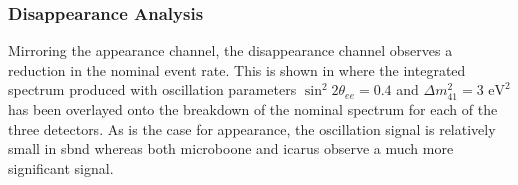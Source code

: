 \subsubsection{\texorpdfstring{\nue Disappearance Analysis}{nue Disappearance Analysis}}

Mirroring the \nue appearance channel, the \nue disappearance channel observes a reduction in the nominal \nue event rate. This is shown in  where the integrated spectrum produced with oscillation parameters $\sin^2{2\theta_{ee}} = 0.4$ and $\Delta m^2_{41} = 3 \text{ eV}^2$ has been overlayed onto the breakdown of the nominal spectrum for each of the three detectors. As is the case for \nue appearance, the oscillation signal is relatively small in \gls{sbnd} whereas both \gls{microboone} and \gls{icarus} observe a much more significant signal. 


